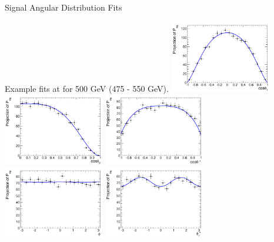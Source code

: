 \begin{frame}{Signal Angular Distribution Fits}
\begin{center}
Example fits at for 500 GeV (475 - 550 GeV).
\includegraphics[width=0.33\textwidth]{images/plots/sigPDF_CosTheta1proj_500.pdf}
\includegraphics[width=0.33\textwidth]{images/plots/sigPDF_CosTheta2proj_500.pdf}
\includegraphics[width=0.33\textwidth]{images/plots/sigPDF_CosThetaSproj_500.pdf}
\\
\includegraphics[width=0.33\textwidth]{images/plots/sigPDF_Phiproj_500.pdf}
\includegraphics[width=0.33\textwidth]{images/plots/sigPDF_PhiStar1proj_500.pdf}


\end{center}
\end{frame}

